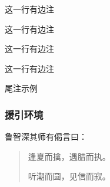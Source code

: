 \documentclass{ctexart}
\begin{document}

            这一行有边注

            {这一行有边注
            \reversemarginpar
            
            这一行有边注
            
            }

            这一行有边注


            尾注示例
            
        \subsubsection{援引环境}
            鲁智深其师有偈言曰：
            \begin{quote}
                逢夏而擒，遇腊而执。

                听潮而圆，见信而寂。
            \end{quote}
\end{document}
